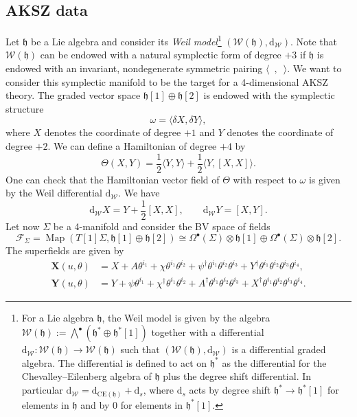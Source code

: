 \documentclass[11pt,colorinlistoftodos]{amsart}
\numberwithin{equation}{subsection}
\theoremstyle{plain}
\theoremstyle{definition}
\theoremstyle{remark}
\newcommand{\dd}{{\mathrm{d}}}
\newcommand{\calW}{\mathcal{W}}
\newcommand{\calF}{\mathcal{F}}
\DeclareMathOperator{\Map}{Map}
\begin{document}
\subsection{AKSZ data}
\label{subsec:AKSZ_data}
Let $\mathfrak{h}$ be a Lie algebra and consider its \emph{Weil model}\footnote{For a Lie algebra $\mathfrak{h}$, the Weil model is given by the algebra $\calW(\mathfrak{h}):=\bigwedge^\bullet(\mathfrak{h^*}\oplus\mathfrak{h}^*[1])$ together with a differential $\dd_\calW\colon \calW(\mathfrak{h})\to \calW(\mathfrak{h})$ such that $(\calW(\mathfrak{h}),\dd_\calW)$ is a differential graded algebra. The differential is defined to act on $\mathfrak{h}^*$ as the differential for the Chevalley--Eilenberg algebra of $\mathfrak{h}$ plus the degree shift differential. In particular $\dd_\calW=\dd_{\mathrm{CE}(\mathfrak{h})}+\dd_s$, where $\dd_s$ acts by degree shift $\mathfrak{h}^*\to \mathfrak{h}^*[1]$ for elements in $\mathfrak{h}$ and by $0$ for elements in $\mathfrak{h}^*[1]$.} $(\calW(\mathfrak{h}),\dd_\calW)$. 
Note that $\calW(\mathfrak{h})$ can be endowed with a natural symplectic form of degree $+3$ if $\mathfrak{h}$ is endowed with an invariant, nondegenerate symmetric pairing $\langle\enspace,\enspace\rangle$. We want to consider this symplectic manifold to be the target for a 4-dimensional AKSZ theory. The graded vector space $\mathfrak{h}[1]\oplus\mathfrak{h}[2]$ is endowed with the symplectic structure 
\[
\omega=\langle\delta X,\delta Y\rangle, 
\]
where $X$ denotes the coordinate of degree $+1$ and $Y$ denotes the coordinate of degree $+2$. We can define a Hamiltonian of degree $+4$ by
\[
\Theta(X,Y)=\frac{1}{2}\langle Y,Y\rangle+\frac{1}{2}\langle Y,[X,X]\rangle.
\]
One can check that the Hamiltonian vector field of $\Theta$ with respect to $\omega$ is given by the Weil differential $\dd_\calW$. We have
\begin{equation}
\label{eq:Weil_differential_relation}
\dd_\calW X=Y+\frac{1}{2}[X,X],\qquad \dd_\calW Y=[X,Y].
\end{equation}
Let now $\Sigma$ be a 4-manifold and consider the BV space of fields 
\[
\calF_\Sigma=\Map(T[1]\Sigma,\mathfrak{h}[1]\oplus \mathfrak{h}[2])\cong \Omega^\bullet(\Sigma)\otimes\mathfrak{h}[1]\oplus \Omega^\bullet(\Sigma)\otimes \mathfrak{h}[2]. 
\]
The superfields are given by 
\begin{align}
\mathbf{X}(u,\theta)&=X+A\theta^{i_1}+\chi\theta^{i_1}\theta^{i_2}+\psi^\dagger\theta^{i_1}\theta^{i_2}\theta^{i_3}+Y^\dagger\theta^{i_1}\theta^{i_2}\theta^{i_3}\theta^{i_4},\\
\mathbf{Y}(u,\theta)&=Y+\psi\theta^{i_1}+\chi^\dagger\theta^{i_1}\theta^{i_2}+A^\dagger\theta^{i_1}\theta^{i_2}\theta^{i_3}+X^\dagger\theta^{i_1}\theta^{i_2}\theta^{i_3}\theta^{i_4}.
\end{align}
\end{document}
